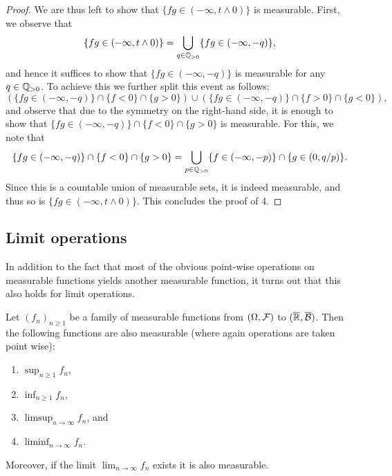 \begin{proof}
We are thus left to show that $\{fg \in (-\infty, t \wedge 0)\}$ is measurable. First, we observe that
\[
	\{fg \in (-\infty, t \wedge 0)\} = \bigcup_{q \in \mathbb Q_{>0}} \{fg \in (-\infty,-q)\},
\]
and hence it suffices to show that $\{fg \in (-\infty,-q)\}$ is measurable for any $q \in \mathbb Q_{>0}$. To achieve this we further split this event as follows:
\[
	\left(\{fg \in (-\infty,-q)\} \cap \{f < 0\} \cap \{g > 0\}\right) 
	\cup \left(\{fg \in (-\infty,-q)\} \cap \{f > 0\} \cap \{g < 0\}\right),
\]
and observe that due to the symmetry on the right-hand side, it is enough to show that $\{fg \in (-\infty,-q)\} \cap \{f < 0\} \cap \{g > 0\}$ is measurable. For this, we note that
\[
	\{fg \in (-\infty,-q)\} \cap \{f < 0\} \cap \{g > 0\} 
	= \bigcup_{p \in \mathbb Q_{>0}} \{f \in (-\infty, -p)\} \cap \{g \in (0, q/p)\}.
\]
Since this is a countable union of measurable sets, it is indeed measurable, and thus so is $\{fg \in (-\infty, t \wedge 0)\}$. This concludes the proof of 4.
\end{proof}

\subsection{Limit operations}

In addition to the fact that most of the obvious point-wise operations on measurable functions yields another measurable function, it turns out that this also holds for limit operations. 

\begin{lemma}\label{lem:limit_operations_measurable_functions}
Let $(f_n)_{n \ge 1}$ be a family of measurable functions from $(\Omega, \mathcal F)$ to  $(\overline{\mathbb R}, \overline{\mathcal B})$. Then the following functions are also measurable (where again operations are taken point wise):
\begin{enumerate}
\item $\sup_{n \ge 1} f_n$,
\item $\inf_{n \ge 1} f_n$,
\item $\limsup_{n \to \infty} f_n$, and
\item $\liminf_{n \to \infty} f_n$.
\end{enumerate}

Moreover, if the limit $\lim_{n \to \infty} f_n$ exists it is also measurable. 
\end{lemma}

